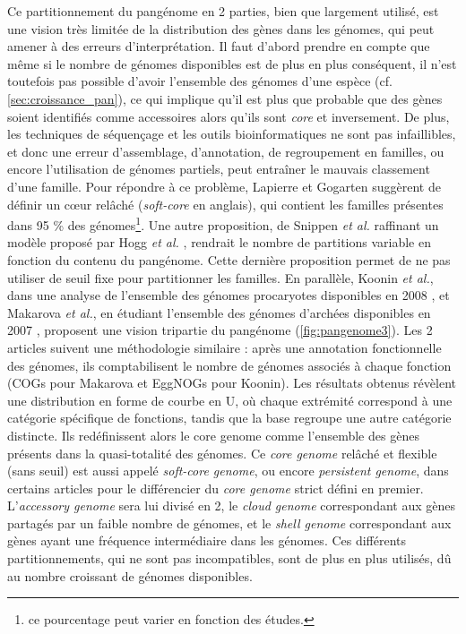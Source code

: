 \newpage
Ce partitionnement du pangénome en 2 parties, bien que largement utilisé, est une vision très limitée de la distribution des gènes dans les génomes, qui peut amener à des erreurs d'interprétation. Il faut d'abord prendre en compte que même si le nombre de génomes disponibles est de plus en plus conséquent, il n'est toutefois pas possible d'avoir l'ensemble des génomes d'une espèce (cf. \autoref{sec:croissance_pan}), ce qui implique qu'il est plus que probable que des gènes soient identifiés comme accessoires alors qu'ils sont \textit{core} et inversement. 
De plus, les techniques de séquençage et les outils bioinformatiques ne sont pas infaillibles, et donc une erreur d'assemblage, d'annotation, de regroupement en familles, ou encore l'utilisation de génomes partiels, peut entraîner le mauvais classement d'une famille. Pour répondre à ce problème, Lapierre et Gogarten \cite{lapierre_estimating_2009} suggèrent de définir un c\oe ur relâché (\textit{soft-core} en anglais), qui contient les familles présentes dans 95 \% des génomes\footnote{ce pourcentage peut varier en fonction des études.}. Une autre proposition, de Snippen \textit{et al.} \cite{snipen_microbial_2009} raffinant un modèle proposé par Hogg \textit{et al.} \cite{hogg_characterization_2007}, rendrait le nombre de partitions variable en fonction du contenu du pangénome. Cette dernière proposition permet de ne pas utiliser de seuil fixe pour partitionner les familles.
En parallèle, Koonin \textit{et al.}, dans une analyse de l'ensemble des génomes procaryotes disponibles en 2008 \cite{koonin_genomics_2008}, et Makarova \textit{et al.}, en étudiant l'ensemble des génomes d'archées disponibles en 2007 \cite{makarova_clusters_2007}, proposent une vision tripartie du pangénome (\autoref{fig:pangenome3}). Les 2 articles suivent une méthodologie similaire : après une annotation fonctionnelle des génomes, ils comptabilisent le nombre de génomes associés à chaque fonction (COGs pour Makarova et EggNOGs \cite{jensen_eggnog_2008} pour Koonin). Les résultats obtenus révèlent une distribution en forme de courbe en U, où chaque extrémité correspond à une catégorie spécifique de fonctions, tandis que la base regroupe une autre catégorie distincte. Ils redéfinissent alors le core genome comme l’ensemble des gènes présents dans la quasi-totalité des génomes. Ce \textit{core genome} relâché et flexible (sans seuil) est aussi appelé \textit{soft-core genome}, ou encore \textit{persistent genome}, dans certains articles pour le différencier du \textit{core genome} strict défini en premier. L'\textit{accessory genome} sera lui divisé en 2, le \textit{cloud genome} correspondant aux gènes partagés par un faible nombre de génomes, et le \textit{shell genome} correspondant aux gènes ayant une fréquence intermédiaire dans les génomes. Ces différents partitionnements, qui ne sont pas incompatibles, sont de plus en plus utilisés, dû au nombre croissant de génomes disponibles. 

